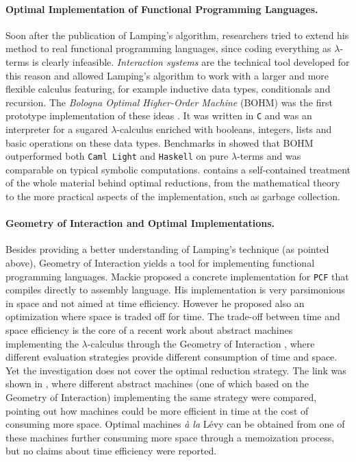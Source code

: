 \documentclass[english]{scrartcl}
\begin{document}
\paragraph{Optimal Implementation of Functional Programming Languages.}Soon after the publication of Lamping's algorithm, researchers tried to extend his method to real functional programming languages, since coding everything as $\lambda$-terms is clearly infeasible. \emph{Interaction systems} \cite{asperti_interaction_1994, asperti_interaction_1996} are the technical tool developed for this reason and allowed Lamping's algorithm to work with a larger and more flexible calculus featuring, for example inductive data types, conditionals and recursion. The \emph{Bologna Optimal Higher-Order Machine} (BOHM) was the first prototype implementation of these ideas \cite{asperti_bologna_1996}. It was written in \texttt{C} and was an interpreter for a sugared $\lambda$-calculus enriched with booleans, integers, lists and basic operations on these data types. Benchmarks in \cite{asperti_optimal_1998} showed that BOHM outperformed both \texttt{Caml Light} and \texttt{Haskell} on pure $\lambda$-terms and was comparable on typical symbolic computations. \cite{asperti_optimal_1998} contains a self-contained treatment of the whole material behind optimal reductions, from the mathematical theory to the more practical aspects of the implementation, such as garbage collection.
\paragraph{Geometry of Interaction and Optimal Implementations.}Besides providing a better understanding of Lamping's technique (as pointed above), Geometry of Interaction yields a tool for implementing functional programming languages. Mackie \cite{mackie_geometry_1995} proposed a concrete implementation for \texttt{PCF} that compiles directly to assembly language. His implementation is very parsimonious in space and not aimed at time efficiency. However he proposed also an optimization where space is traded off for time. The trade-off between time and space efficiency is the core of a recent work about abstract machines implementing the $\lambda$-calculus through the Geometry of Interaction \cite{muroya_dynamic_2018}, where different evaluation strategies provide different consumption of time and space. Yet the investigation does not cover the optimal reduction strategy. The link was shown in \cite{danos_reversible_1999}, where different abstract machines (one of which based on the Geometry of Interaction) implementing the same strategy were compared, pointing out how machines could be more efficient in time at the cost of consuming more space. Optimal machines \emph{à la} Lévy can be obtained from one of these machines further consuming more space through a memoization process, but no claims about time efficiency were reported.
\end{document}
